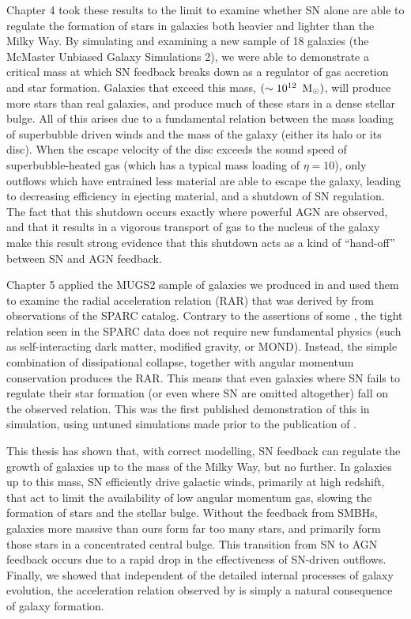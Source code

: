 Chapter 4 took these results to the limit to examine whether SN alone are able
to regulate the formation of stars in galaxies both heavier and lighter than the
Milky Way.  By simulating and examining a new sample of 18 galaxies (the
McMaster Unbiased Galaxy Simulations 2), we were able to demonstrate a critical
mass at which SN feedback breaks down as a regulator of gas accretion and star
formation.  Galaxies that exceed this mass, $(\sim 10^{12}\;\>{\rm M_{\odot}})$, will produce
more stars than real galaxies, and produce much of these stars in a dense
stellar bulge.  All of this arises due to a fundamental relation between the
mass loading of superbubble driven winds and the mass of the galaxy (either its
halo or its disc).  When the escape velocity of the disc exceeds the sound speed
of superbubble-heated gas (which has a typical mass loading of $\eta=10$), only
outflows which have entrained less material are able to escape the galaxy,
leading to decreasing efficiency in ejecting material, and a shutdown of
SN regulation.  The fact that this shutdown occurs exactly where powerful AGN
are observed, and that it results in a vigorous transport of gas to the nucleus
of the galaxy make this result strong evidence that this shutdown acts as a kind
of ``hand-off'' between SN and AGN feedback.

Chapter 5 applied the MUGS2 sample of galaxies we produced in
\citet{Keller2016a} and used them to examine the radial acceleration relation
(RAR) that was derived by \citet{McGaugh2016} from observations of the SPARC
\citep{Lelli2016} catalog.  Contrary to the assertions of some
\citep{Milgrom2016}, the tight relation seen in the SPARC data does not require
new fundamental physics (such as self-interacting dark matter, modified gravity,
or MOND).  Instead, the simple combination of dissipational collapse, together
with angular momentum conservation produces the RAR. This means that even
galaxies where SN fails to regulate their star formation (or even where SN are
omitted altogether) fall on the observed relation.  This was the first published
demonstration of this in simulation, using untuned simulations made prior to the
publication of \citet{McGaugh2016}.

This thesis has shown that, with correct modelling, SN feedback can regulate the
growth of galaxies up to the mass of the Milky Way, but no further.  In galaxies
up to this mass, SN efficiently drive galactic winds, primarily at
high redshift, that act to limit the availability of low angular momentum gas,
slowing the formation of stars and the stellar bulge. Without the
feedback from SMBHs, galaxies more massive than ours form far too many stars,
and primarily form those stars in a concentrated central bulge.  This transition
from SN to AGN feedback occurs due to a rapid drop in the effectiveness of
SN-driven outflows.  Finally, we showed that independent of the detailed
internal processes of galaxy evolution, the acceleration relation observed by
\citet{McGaugh2016} is simply a natural consequence of galaxy formation.

